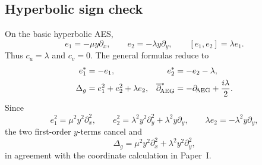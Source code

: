 \subsection{Hyperbolic sign check}

On the basic hyperbolic AES,
\[
 e_1=-\mu y\partial_x,
 \qquad
 e_2=-\lambda y\partial_y,
 \qquad
 [e_1,e_2]=\lambda e_1.
\]
Thus $c_u=\lambda$ and $c_v=0$.  The general formulas reduce to
\begin{align*}
 e_1^*&=-e_1,
 &e_2^*&=-e_2-\lambda,\\
 \Delta_g&=e_1^2+e_2^2+\lambda e_2,
 &\overline\partial_{\!\mathrm{AEG}}^*&=-\partial_{\!\mathrm{AEG}}+\frac{i\lambda}{2}.
\end{align*}
Since
\[
 e_1^2=\mu^2y^2\partial_x^2,
 \qquad
 e_2^2=\lambda^2y^2\partial_y^2
          +\lambda^2y\partial_y,
 \qquad
 \lambda e_2=-\lambda^2y\partial_y,
\]
the two first-order $y$-terms cancel and
\[
 \Delta_g
 =\mu^2y^2\partial_x^2+\lambda^2y^2\partial_y^2,
\]
in agreement with the coordinate calculation in Paper~I.

